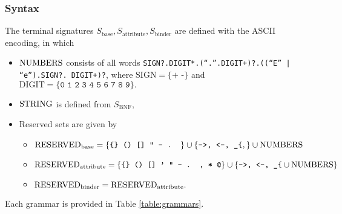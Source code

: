 \subsubsection*{Syntax}
\label{section:syntax}

The terminal signatures $S_{\mathrm{base}}, S_{\mathrm{attribute}}, S_{\mathrm{binder}}$ are defined with the ASCII encoding, in which
\begin{itemize}
\item $\mathrm{NUMBERS}$ consists of all words \texttt{SIGN?.DIGIT*.(``.''.DIGIT+)?.((``E'' | ``e'').SIGN?. DIGIT+)?}, where $\mathrm{SIGN} = \{\texttt{+ -}\}$ and $\mathrm{DIGIT} = \{\texttt{0 1 2 3 4 5 6 7 8 9}\}.$
  \item $\mathrm{STRING}$ is defined from $S_{\mathrm{BNF}},$
\item Reserved sets are given by
\begin{itemize}
\item $\mathrm{RESERVED}_{\textrm{base}} = \{\texttt{\{\} () [] " - . }\} \cup \{\texttt{->, <-, \_\{},\} \cup \mathrm{NUMBERS} $
  \item $\mathrm{RESERVED}_{\textrm{attribute}} = \{\texttt{\{\} () [] ' " - . , * @}\} \cup \{\texttt{->, <-, \_\{} \cup \mathrm{NUMBERS} \}$ %
\item $\mathrm{RESERVED}_{\textrm{binder}} = \mathrm{RESERVED}_{\textrm{attribute}}.$
\end{itemize}
\end{itemize}



Each grammar is provided in Table \ref{table:grammars}.


